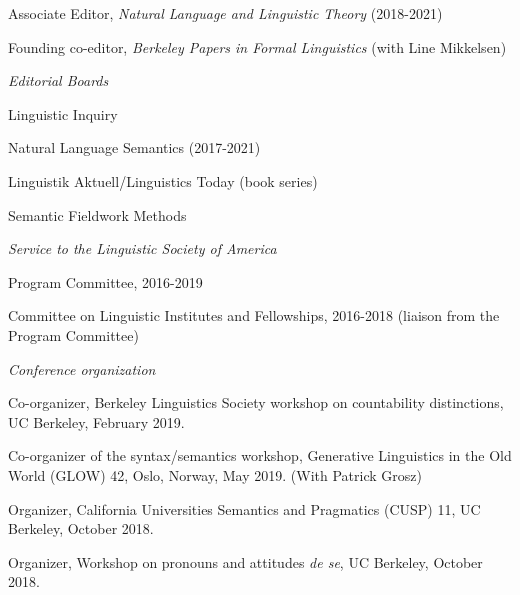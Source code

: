 \documentclass[12pt]{article}
\begin{document}
\ind Associate Editor, \emph{Natural Language and Linguistic Theory} (2018-2021)

\ind Founding co-editor, \emph{Berkeley Papers in Formal Linguistics} (with Line Mikkelsen)


\bigskip%



\noindent\emph{Editorial Boards\vspace{0.05in}}


\ind
{Linguistic Inquiry} %





\ind Natural Language Semantics (2017-2021)

\ind Linguistik Aktuell/Linguistics Today (book series)
 
\ind Semantic Fieldwork Methods


\bigskip%




\noindent\emph{Service to the Linguistic Society of America\vspace{0.05in}}


\ind
Program Committee, 2016-2019

\ind 
Committee on Linguistic Institutes and Fellowships, 2016-2018 (liaison from the Program Committee)

 
\bigskip%





\noindent\emph{Conference organization\vspace{0.05in}}
 
 \ind Co-organizer, Berkeley Linguistics Society workshop on countability distinctions, UC Berkeley, February 2019. 
 
 \ind Co-organizer of the syntax/semantics workshop, Generative Linguistics in the Old World (GLOW) 42, Oslo, Norway, May 2019. (With Patrick Grosz)
 
 \ind Organizer, California Universities Semantics and Pragmatics (CUSP) 11, UC Berkeley, October 2018.
 
  \ind Organizer, Workshop on pronouns and attitudes \emph{de se}, UC Berkeley, October 2018.
 
\end{document}
